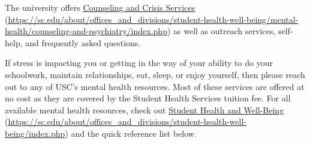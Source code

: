 \documentclass[11pt,letterpaper]{article}
\begin{document}

The university offers \href{https://sc.edu/about/offices\_and\_divisions/student-health-well-being/mental-health/counseling-and-psychiatry/index.php}{Counseling and Crisis Services} (\url{https://sc.edu/about/offices\_and\_divisions/student-health-well-being/mental-health/counseling-and-psychiatry/index.php}) as well as outreach services, self-help, and frequently asked questions. \pspace

If stress is impacting you or getting in the way of your ability to do your schoolwork, maintain relationships, eat, sleep, or enjoy yourself, then please reach out to any of USC's mental health resources. Most of these services are offered at no cost as they are covered by the Student Health Services tuition fee. For all available mental health resources, check out \href{https://sc.edu/about/offices\_and\_divisions/student-health-well-being/index.php}{Student Health and Well-Being} (\url{https://sc.edu/about/offices\_and\_divisions/student-health-well-being/index.php}) and the quick reference list below. 
\end{document}
